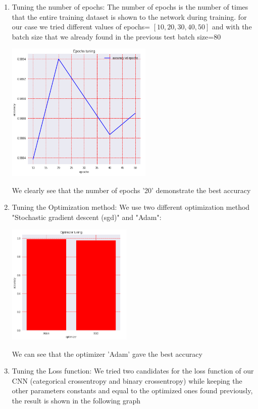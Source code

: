\documentclass[12pt,a4paper]{report}
\begin{document}
\begin{enumerate}
\begin{enumerate}
\item Tuning the number of epochs:
The number of epochs is the number of times that the entire training dataset is shown to the network during training.
for our case we tried different values of epochs=
$[10, 20, 30, 40, 50]$ and with the batch size that we already found in the previous test batch size=80

\begin{center}
\includegraphics[width=7cm]{Capture2.png}
\end{center}

We clearly see that the number of epochs '20' demonstrate the best accuracy

\item Tuning the Optimization method:
We use two different optimization method "Stochastic gradient descent (sgd)" and "Adam":  


\begin{center}
\includegraphics[width=6cm]{Capture3.png}
\end{center}

We can see that the optimizer 'Adam' gave the best accuracy 

\item Tuning the Loss function:
We tried two candidates for the loss function of our CNN (categorical crossentropy and binary crossentropy) while keeping the other parameters constants and equal to the optimized ones found previously, the result is shown in the following graph


\end{enumerate}
\end{enumerate}
\end{document}
